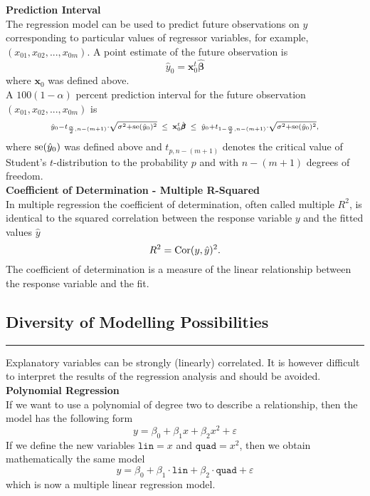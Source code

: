 \textbf{Prediction Interval}\\
The regression model can be used to predict future observations on $y$ corresponding to particular values of regressor variables, for example, $(x_{01}, x_{02}, . . . , x_{0m})$. A point estimate of the future observation is
\begin{equation}
  \hat{y}_0 = \mathbf{x}^t_0 \hat{\pmb{\beta}}
\end{equation}
where $\mathbf{x}_0$ was defined above.\\
A $100(1 - \alpha)$ percent prediction interval for the future observation $(x_{01}, x_{02}, . . . , x_{0m})$ is
\begin{equation} \scriptstyle
  \hat{y}_0 - t_{\frac{\alpha}{2},n-(m+1)} \cdot \sqrt{\sigma^2 + \textup{se}(\hat{y}_0)^2}
  \;\; \leq \;\; \mathbf{x}^t_0 \hat{\pmb{\beta}} \;\; \leq \;\;
  \hat{y}_0 + t_{1-{\frac{\alpha}{2},n-(m+1)}} \cdot \sqrt{\sigma^2 + \textup{se}(\hat{y}_0)^2},
\end{equation}
where $\textup{se}(\hat{y}_0)$ was defined above and $t_{p,n-(m+1)}$ denotes the critical value of Student’s $t$-distribution to the probability $p$ and with $n - (m + 1)$ degrees of freedom.\\

\textbf{Coefficient of Determination - Multiple R-Squared}\\
In multiple regression the coefficient of determination, often called multiple $R^2$, is identical to the squared correlation between the response variable $y$ and the fitted values $\hat{y}$
\begin{equation}
  R^2 = \textup{Cor}(y, \hat{y})^2.
\end{equation}
The coefficient of determination is a measure of the linear relationship between the response variable and the fit.


\subsection{Diversity of Modelling Possibilities}
\noindent\rule[\linienAbstand]{\linewidth}{\linienDicke}
Explanatory variables can be strongly (linearly) correlated. It is however difficult to interpret the results of the regression analysis and should be avoided.\\

\textbf{Polynomial Regression}\\
If we want to use a polynomial of degree two to describe a relationship, then the model has the following form
\begin{equation}
  y = \beta_0 + \beta_1x + \beta_2 x^2 + \varepsilon
\end{equation}
If we define the new variables $\texttt{lin} = x$ and $\texttt{quad} = x^2$, then we obtain mathematically the same model
\begin{equation}
  y = \beta_0 + \beta_1 \cdot \texttt{lin} + \beta_2 \cdot \texttt{quad} + \varepsilon
\end{equation}
which is now a multiple linear regression model.\\

